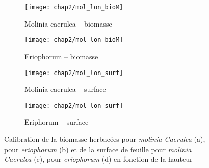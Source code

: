 \begin{figure}
	\centering
	\begin{subfigure}[t]{0.5\textwidth}
		\centering
		\texttt{[image: chap2/mol\_lon\_bioM]}
		\caption{Molinia caerulea -- biomasse}
	\end{subfigure}%
	\begin{subfigure}[t]{0.5\textwidth}
		\centering
		\texttt{[image: chap2/mol\_lon\_bioM]}
		\caption{Eriophorum -- biomasse}
	\end{subfigure}
	
	
	\begin{subfigure}[t]{0.5\textwidth}
		\centering
		\texttt{[image: chap2/mol\_lon\_surf]}
		\caption{Molinia caerulea -- surface}
	\end{subfigure}%
	\begin{subfigure}[t]{0.5\textwidth}
		\centering
		\texttt{[image: chap2/mol\_lon\_surf]}
		\caption{Eriphorum -- surface}
	\end{subfigure}
\caption{Calibration de la biomasse herbacées pour \textit{molinia Caerulea} (a), pour \textit{eriophorum} (b) et de la surface de feuille pour \textit{molinia Caerulea} (c), pour \textit{eriophorum} (d) en fonction de la hauteur}
\label{fig:cal_herb}
\end{figure}


